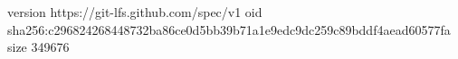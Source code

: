version https://git-lfs.github.com/spec/v1
oid sha256:c296824268448732ba86ce0d5bb39b71a1e9edc9dc259c89bddf4aead60577fa
size 349676
